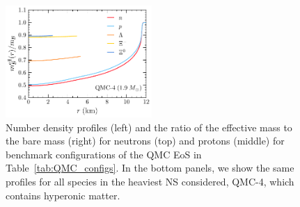 \begin{figure}
    \includegraphics[width=0.495\textwidth]{meff_B_QMC_profs.pdf}
    \caption{Number density profiles (left) and the ratio of the effective mass to the bare mass (right) for neutrons (top) and protons (middle) for benchmark configurations of the QMC EoS in Table~\ref{tab:QMC_configs}. In the bottom panels, we show the same profiles for all species in the heaviest NS considered, QMC-4, which contains hyperonic matter.}
    \label{fig:QMC_profiles}
\end{figure}
